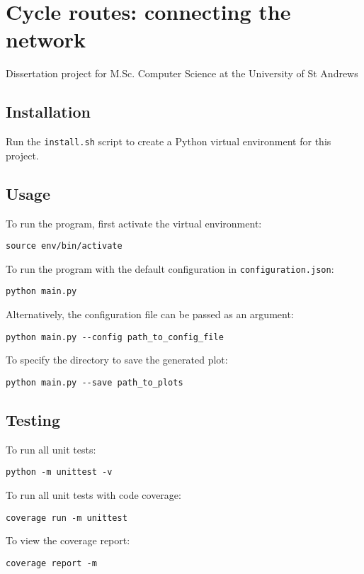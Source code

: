 \hypertarget{cycle-routes-connecting-the-network}{%
\section*{Cycle routes: connecting the
network}\label{cycle-routes-connecting-the-network}}

Dissertation project for M.Sc. Computer Science at the University of St
Andrews

\hypertarget{installation}{%
\subsection*{Installation}\label{installation}}

Run the \texttt{install.sh} script to create a Python virtual
environment for this project.

\hypertarget{usage}{%
\subsection*{Usage}\label{usage}}

To run the program, first activate the virtual environment:

\begin{verbatim}
source env/bin/activate
\end{verbatim}

To run the program with the default configuration in
\texttt{configuration.json}:

\begin{verbatim}
python main.py
\end{verbatim}

Alternatively, the configuration file can be passed as an argument:

\begin{verbatim}
python main.py --config path_to_config_file
\end{verbatim}

To specify the directory to save the generated plot:

\begin{verbatim}
python main.py --save path_to_plots
\end{verbatim}

\hypertarget{testing}{%
\subsection*{Testing}\label{testing}}

To run all unit tests:

\begin{verbatim}
python -m unittest -v
\end{verbatim}

To run all unit tests with code coverage:

\begin{verbatim}
coverage run -m unittest
\end{verbatim}

To view the coverage report:

\begin{verbatim}
coverage report -m
\end{verbatim}
